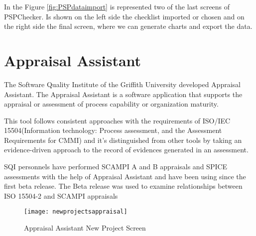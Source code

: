 In the Figure \ref{fig:PSPdataimport} is represented two of the last screens of PSPChecker. Is shown on the left side the checklist imported or chosen and on the right side the final screen, where we can generate charts and export the data.

\section{Appraisal Assistant}

The Software Quality Institute of the Griffith University\citep{SoftwareQuality2015} developed Appraisal Assistant. The Appraisal Assistant\citep{Appraisal2015} is a software application that supports the appraisal or assessment of process capability or organization maturity.

This tool follows consistent approaches with the requirements of ISO/IEC 15504(Information technology: Process assessment, and the Assessment Requirements for CMMI)\citep{ISOIEC} and it's distinguished from other tools by taking an evidence-driven approach to the record of evidences generated in an assessment.

SQI personnels have performed SCAMPI A and B appraisals and SPICE assessments with the help of Appraisal Assistant and have been using since the first beta release. The Beta release was used to examine relationships between ISO 15504-2 and SCAMPI appraisals

\begin{figure}[h]
	\begin{center}
		\leavevmode
		\texttt{[image: newprojectsappraisal]}
		\caption{Appraisal Assistant New Project Screen}
		\label{fig:newprojectsappraisal}
	\end{center}
\end{figure}

